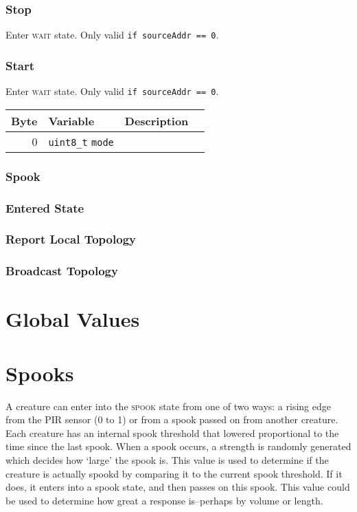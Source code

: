 \documentclass{article}
\newcommand{\code}{\texttt}
\newcommand{\uint}[1]{\code{uint#1\_t}}
\begin{document}
\subsubsection{Stop}

Enter \textsc{wait} state. Only valid \code{if sourceAddr == 0}.

\subsubsection{Start}

Enter \textsc{wait} state. Only valid \code{if sourceAddr == 0}.

\begin{tabular}{r|l|l|l}
\textbf{Byte} & \textbf{Variable} & \textbf{Description}\\\hline
0 & \uint{8} \code{mode} & \
\end{tabular}

\subsubsection{Spook}
\subsubsection{Entered State}
\subsubsection{Report Local Topology}
\subsubsection{Broadcast Topology}
\endgroup

\clearpage
\section{Global Values}

\clearpage
\section{Spooks}
A creature can enter into the \textsc{spook} state from one of two ways: a rising edge from the PIR sensor (0 to 1) or from a spook passed on from another creature. 
Each creature has an internal spook threshold that lowered proportional to the time since the last spook.
When a spook occurs, a strength is randomly generated which decides how `large' the spook is.
This value is used to determine if the creature is actually spookd by comparing it to the current spook threshold. If it does, it enters into a spook state, and then passes on this spook.
This value could be used to determine how great a response is--perhaps by volume or length.\\
\end{document}
